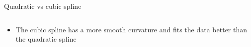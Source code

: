 \documentclass[english]{beamer}
\newcommand{\alertblue}[1]{{\color{blue}#1}}
\begin{document}
\begin{frame}{Quadratic vs cubic spline}
\begin{columns}
\begin{column}{0.5\textwidth}
    \end{column}
\end{columns}
    \begin{itemize}
        \item The \alertblue{cubic spline} has a \alertblue{more smooth curvature} and \alertblue{fits the data better} than the \alertblue{quadratic spline}  
    \end{itemize}
\end{frame}
        
\end{document}
